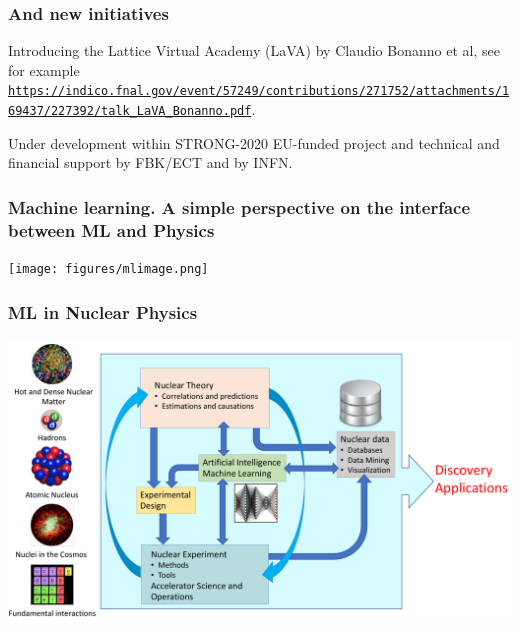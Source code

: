 \documentclass{beamer}
\begin{document}
\begin{frame}
\frametitle{And new initiatives}

Introducing the Lattice Virtual Academy (LaVA) by Claudio Bonanno et al, see for example \href{{https://indico.fnal.gov/event/57249/contributions/271752/attachments/169437/227392/talk_LaVA_Bonanno.pdf}}{\nolinkurl{https://indico.fnal.gov/event/57249/contributions/271752/attachments/169437/227392/talk_LaVA_Bonanno.pdf}}.

Under development within STRONG-2020 EU-funded project and technical and financial support by FBK/ECT and by INFN.
\end{frame}

\begin{frame}
\frametitle{Machine learning. A simple perspective on the interface between ML and Physics}

\vspace{6mm}

\centerline{\texttt{[image: figures/mlimage.png]}}

\vspace{6mm}
\end{frame}

\begin{frame}
\frametitle{ML in Nuclear  Physics}

\vspace{6mm}

\centerline{\includegraphics[width=1.0\linewidth]{figures/ML-NP.pdf}}

\vspace{6mm}
\end{frame}
\end{document}
